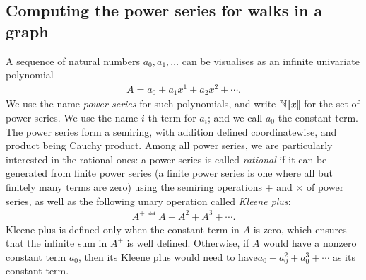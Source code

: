 \subsection{Computing the power series for walks in a graph}
\label{sec:power-series}
A sequence of natural numbers $a_0,a_1,\ldots$ can be visualises as  an infinite univariate polynomial
\begin{align*}
 A = a_0 + a_1x^1 + a_2x^2 + \cdots.
\end{align*}
We use the name \emph{power series} for such polynomials, and write $\mathbb N [\![x]\!]$ for the set of power series. 
We use the name $i$-th term for $a_i$; and we call $a_0$ the constant term. The power series form a semiring, with addition defined coordinatewise, and product being Cauchy product. Among all power series, we are particularly interested in the rational ones: a power series is called \emph{rational} if it can be generated from finite power series (a finite power series is one where all but finitely many terms are zero) using the semiring operations $+$ and $\times$ of power series, as well as the following unary  operation called \emph{Kleene plus}:
\begin{align*}
 A^+ \eqdef A + A^2 + A^3 + \cdots.
\end{align*}   
Kleene plus   is defined only when the constant term   in $A$ is zero, which ensures that the infinite sum in $A^+$ is well defined. Otherwise, if $A$ would have a nonzero constant term $a_0$, then its Kleene plus would need to have$a_0 + a_0^2 + a_0^3 + \cdots$ as its constant term.

